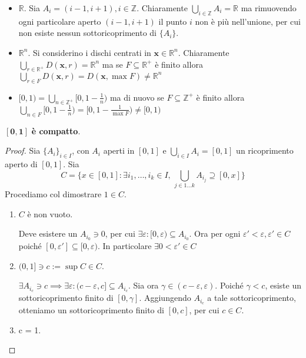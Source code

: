 \begin{example} \(\) 
\begin{itemize}[label = --]
    \item \(\mathbb{R}\). Sia \(A_{i} = (i - 1, i + 1), i \in \mathbb{Z}\).
        Chiaramente \(\bigcup_{i \in  \mathbb{Z}} A_{i} = \mathbb{R}\) ma
        rimuovendo ogni particolare aperto \((i - 1, i + 1)\) il punto \(i\) non
        è più nell'unione, per cui non esiste nessun sottoricoprimento di
        \(\{A_{i}\} \).
    \item \(\mathbb{R}^{n}\). Si considerino i dischi centrati in \(\mathbf{x} \in
        \mathbb{R}^{n}\). Chiaramente \(\bigcup_{r \in
        \mathbb{R}^{+}}D(\mathbf{x}, r) = \mathbb{R}^{n} \) ma se \(F \subseteq
        \mathbb{R}^{+}\) è finito allora \(\bigcup_{r \in F} D(\mathbf{x}, r) =
        D(\mathbf{x}, \max F) \neq \mathbb{R}^{n}\) 
    \item \([0, 1) = \bigcup_{n \in \mathbb{Z}^{+}}[0, 1 - \frac{1}{n})\) ma di
        nuovo se \(F \subseteq \mathbb{Z}^{+} \) è finito allora \(\bigcup_{n
        \in F} [0, 1 - \frac{1}{n}) = [0, 1 - \frac{1}{\max F}) \neq [0, 1)\) 
\end{itemize}
\begin{example} \(\mathbf{[0, 1]}\) \textbf{è compatto}.
\end{example}
\begin{proof}
    Sia \(\{A_{i}\}_{i \in  I}\), con \(A_{i}\) aperti in \([0, 1]\) e
    \(\bigcup_{i \in  I} A_{i} = [0, 1]\) un ricoprimento aperto di \([0, 1]\).
    Sia \[C = \{x \in [0, 1] : \exists i_{1}, \dots, i_k \in I, \, \bigcup_{j
    \in 1\dots k} A_{i_j} \supseteq [0, x] \} \]
    Procediamo col dimostrare \(1 \in C\).
\begin{enumerate}[label = \alph*.]
    \item \(C\) è non vuoto.

        Deve esistere un \(A_{i_0} \ni 0\), per cui
        \(\exists \varepsilon : [0, \varepsilon) \subseteq A_{i_0}\). Ora per
        ogni \(\varepsilon' < \varepsilon, \varepsilon' \in C\) poiché \([0,
        \varepsilon'] \subseteq [0, \varepsilon) \). In particolare \(\exists 0
        < \varepsilon'\in C\) 
    \item \((0, 1] \ni c := \sup C \in C\).

        \(\exists A_{i_c} \ni c \implies \exists \varepsilon : (c - \varepsilon,
        c] \subseteq A_{i_c} \). Sia ora \(\gamma \in (c - \varepsilon,
        \varepsilon)\). Poiché \(\gamma < c\), esiste un sottoricoprimento
        finito di \([0, \gamma]\). Aggiungendo \(A_{i_c}\) a tale
        sottoricoprimento, otteniamo un sottoricoprimento finito di \([0, c]\),
        per cui \(c \in C\). 
    \item c = 1.


\end{enumerate}
\end{proof}
\end{example}
